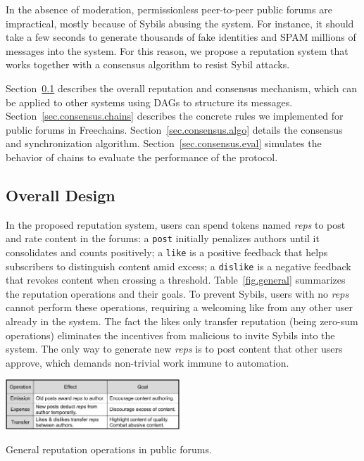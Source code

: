 \documentclass[10pt,journal,compsoc]{IEEEtran}
\newcommand{\FC}       {Freechains\xspace}
\newcommand{\reps}     {\emph{reps}\xspace}
\newcommand{\code}[1]  {\texttt{\footnotesize{#1}}}
\begin{document}
In the absence of moderation, permissionless peer-to-peer public forums are
impractical, mostly because of Sybils abusing the system.
For instance, it should take a few seconds to generate thousands of fake
identities and SPAM millions of messages into the system.
For this reason, we propose a reputation system that works together with a
consensus algorithm to resist Sybil attacks.

Section~\ref{sec.consensus.design} describes the overall reputation and
consensus mechanism, which can be applied to other systems using DAGs to
structure its messages.
Section~\ref{sec.consensus.chains} describes the concrete rules we implemented
for public forums in \FC.
Section~\ref{sec.consensus.algo} details the consensus and synchronization
algorithm.
Section~\ref{sec.consensus.eval} simulates the behavior of chains to evaluate
the performance of the protocol.

\subsection{Overall Design}
\label{sec.consensus.design}

In the proposed reputation system, users can spend tokens named \reps to post
and rate content in the forums:
a \code{post} initially penalizes authors until it consolidates and counts
positively;
a \code{like} is a positive feedback that helps subscribers to distinguish
content amid excess;
a \code{dislike} is a negative feedback that revokes content when crossing a
threshold.
Table~\ref{fig.general} summarizes the reputation operations and their goals.
To prevent Sybils, users with no \reps cannot perform these operations,
requiring a welcoming like from any other user already in the system.
The fact the likes only transfer reputation (being zero-sum operations)
eliminates the incentives from malicious to invite Sybils into the system.
The only way to generate new \reps is to post content that other users approve,
which demands non-trivial work immune to automation.

\begin{table}
\centering
\includegraphics[width=0.49\textwidth]{general.png}
\caption{General reputation operations in public forums.}
\label{fig.general}
\end{table}
\end{document}

